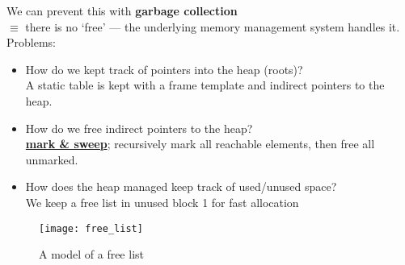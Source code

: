 \documentclass[../../lecture_notes.tex]{subfiles}
\begin{document}
\noindent We can prevent this with \textbf{{garbage collection}}\\
	\indent $\equiv$ there is no ‘free’ — the underlying memory management system handles it.\\
	\indent Problems: \begin{itemize} [itemsep=0mm]
			\item How do we kept track of pointers into the heap (roots)?\\
				A static table is kept with a frame template and indirect pointers to the heap.
			\item How do we free indirect pointers to the heap?\\
				\textbf{\underline{mark \& sweep}}; 
					recursively mark all reachable elements, then free all unmarked.
			\item How does the heap managed keep track of used/unused space?\\
				We keep a free list in unused block 1 for fast allocation
		\end{itemize}

\begin{figure}[H]
	\centering
	\texttt{[image: free\_list]}
	\caption{A model of a free list}
	\label{fig:test}
\end{figure}
\end{document}
